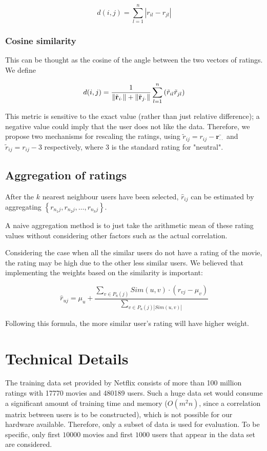 \documentclass[final]{cvpr}
\newcommand{\Set}[1]{\left\{ #1 \right\}}
\DeclarePairedDelimiter{\norm}{\lVert}{\rVert}
\begin{document}
$$ d(i, j) = \sum_{l=1}^n \left| r_{il} - r_{jl} \right| $$

\subsubsection{Cosine similarity}
This can be thought as the cosine of the angle between the two vectors of ratings.
We define

$$ d(i, j) = \frac1{ \norm{\tilde{\mathbf r}_{i\cdot}} 
+ \norm{\tilde{\mathbf r}_{j\cdot}} }
\sum_{l=1}^n \left( \tilde r_{il} \tilde r_{jl} \right) $$

This metric is sensitive to the exact value (rather than just relative difference);
a negative value could imply that the user does not like the data.
Therefore, we propose two mechanisms for rescaling the ratings,
using $\tilde r_{ij} = r_{ij} - \bar{\mathbf r_{\cdot\cdot}}$
and $\tilde r_{ij} = r_{ij} - 3$ respectively,
where $3$ is the standard rating for "neutral".

\subsection{Aggregation of ratings}
After the $k$ nearest neighbour users have been selected,
$\hat r_{ij}$ can be estimated by aggregating $\Set{ r_{n_1j}, r_{n_2j}, \ldots, r_{n_kj} }$.

A naive aggregation method is to just take the arithmetic mean of these rating values
without considering other factors such as the actual correlation.

Considering the case when all the similar users do not have a rating of the movie, the rating may be high due to the other less similar users. We believed that implementing the weights based on the similarity is important:

$$ \hat r_{uj} = \mu_u + \frac{\sum_{v \in P_u(j)}  Sim(u,v)\cdot(r_{vj}-\mu_v)}{\sum_{v \in P_u(j) |Sim(u,v)|}}  $$

Following this formula, the more similar user's rating will have higher weight.

\section{Technical Details}
The training data set provided by Netflix consists of more than 100 million ratings with 17770 movies and 480189 users.
Such a huge data set would consume a significant amount of training time and memory
($O(m^2 n)$, since a correlation matrix between users is to be constructed),
which is not possible for our hardware available.
Therefore, only a subset of data is used for evaluation.
To be specific, only first $10000$ movies and first $1000$ users that appear in the data set are considered.
\end{document}
